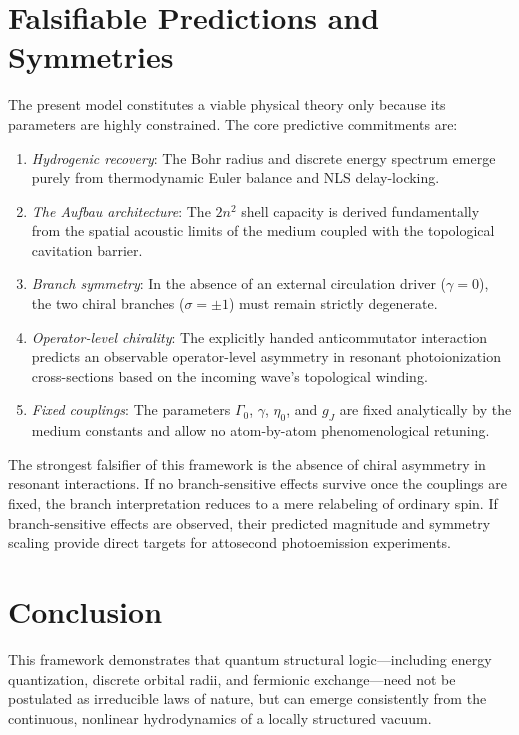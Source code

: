 \documentclass[11pt,a4paper]{article}
\begin{document}
\section{Falsifiable Predictions and Symmetries}
The present model constitutes a viable physical theory only because its parameters are highly constrained. The core predictive commitments are:
\begin{enumerate}[label=(P\arabic*)]
    \item \emph{Hydrogenic recovery}: The Bohr radius and discrete energy spectrum emerge purely from thermodynamic Euler balance and NLS delay-locking.
    \item \emph{The Aufbau architecture}: The $2n^2$ shell capacity is derived fundamentally from the spatial acoustic limits of the medium coupled with the topological cavitation barrier.
    \item \emph{Branch symmetry}: In the absence of an external circulation driver ($\gamma=0$), the two chiral branches ($\sigma = \pm 1$) must remain strictly degenerate.
    \item \emph{Operator-level chirality}: The explicitly handed anticommutator interaction predicts an observable operator-level asymmetry in resonant photoionization cross-sections based on the incoming wave's topological winding.
    \item \emph{Fixed couplings}: The parameters $\Gamma_0$, $\gamma$, $\eta_0$, and $g_J$ are fixed analytically by the medium constants and allow no atom-by-atom phenomenological retuning.
\end{enumerate}

The strongest falsifier of this framework is the absence of chiral asymmetry in resonant interactions. If no branch-sensitive effects survive once the couplings are fixed, the branch interpretation reduces to a mere relabeling of ordinary spin. If branch-sensitive effects are observed, their predicted magnitude and symmetry scaling provide direct targets for attosecond photoemission experiments.

\section{Conclusion}
This framework demonstrates that quantum structural logic---including energy quantization, discrete orbital radii, and fermionic exchange---need not be postulated as irreducible laws of nature, but can emerge consistently from the continuous, nonlinear hydrodynamics of a locally structured vacuum.
\end{document}

